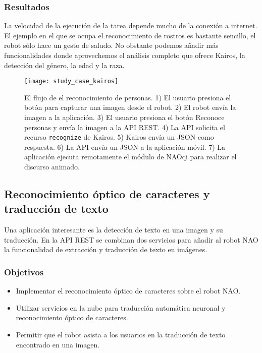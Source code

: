 \subsubsection{Resultados}

La velocidad de la ejecución de la tarea
depende mucho de la conexión a internet.
El ejemplo en el que se ocupa el reconocimiento
de rostros es bastante sencillo, el robot
sólo hace un gesto de saludo. No obstante 
podemos añadir más funcionalidades donde
aprovechemos el análisis completo que ofrece
Kairos, la detección del género, la edad y la raza.



\begin{figure}[htbp]
\centering
\caption{El flujo de el reconocimiento de personas. 1) El usuario presiona el botón para capturar una imagen desde el robot. 2) El robot envía la imagen a la 
aplicación. 3) El usuario presiona el botón Reconoce personas y envía la imagen a la API REST. 4) La API solicita el recurso \texttt{recognize} de Kairos. 5) Kairos envía un JSON como respuesta. 6) La API 
envía un JSON a la aplicación móvil. 7) La aplicación ejecuta remotamente el módulo de NAOqi para realizar el discurso animado.}
\texttt{[image: study\_case\_kairos]}
\end{figure}



\subsection{Reconocimiento óptico de caracteres y traducción de texto}

Una aplicación interesante es la
detección de texto en una imagen y su
traducción.
En la API REST se combinan dos servicios
para añadir al robot NAO la funcionalidad de extracción y traducción de texto en imágenes. 


\subsubsection{Objetivos}

\begin{itemize}
    \item Implementar el reconocimiento óptico
    de caracteres sobre el robot NAO.
    \item Utilizar servicios en la nube para traducción
    automática neuronal y reconocimiento óptico de caracteres.
    \item Permitir que el robot asista a los usuarios
    en la traducción de texto encontrado en una imagen.
\end{itemize}

